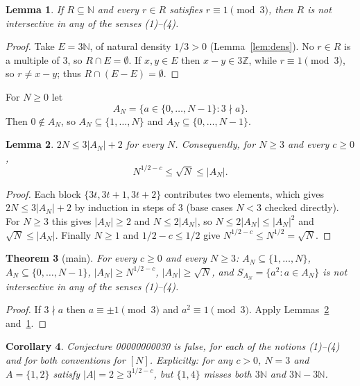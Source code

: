 \documentclass[11pt]{article}
\newtheorem{theorem}{Theorem}
\newtheorem{lemma}[theorem]{Lemma}
\newtheorem{corollary}[theorem]{Corollary}
\theoremstyle{definition}
\theoremstyle{remark}
\renewcommand{\_}{\oldus\allowbreak}
\newcommand{\N}{\mathbb{N}}
\newcommand{\Z}{\mathbb{Z}}
\begin{document}
\begin{lemma}\label{lem:mod3}
If $R\subseteq\N$ and every $r\in R$ satisfies $r\equiv1\pmod 3$, then $R$ is not intersective in any of the
senses (1)--(4).
\end{lemma}

\begin{proof}
Take $E=3\N$, of natural density $1/3>0$ (Lemma~\ref{lem:dens}). No $r\in R$ is a multiple of $3$, so
$R\cap E=\emptyset$. If $x,y\in E$ then $x-y\in 3\Z$, while $r\equiv1\pmod 3$, so $r\neq x-y$; thus
$R\cap(E-E)=\emptyset$.
\end{proof}

For $N\ge0$ let
\[
  A_N=\{a\in\{0,\dots,N-1\} : 3\nmid a\}.
\]
Then $0\notin A_N$, so $A_N\subseteq\{1,\dots,N\}$ and $A_N\subseteq\{0,\dots,N-1\}$.

\begin{lemma}\label{lem:size}
$2N\le 3|A_N|+2$ for every $N$. Consequently, for $N\ge3$ and every $c\ge0$,
\[
  N^{1/2-c}\le\sqrt N\le|A_N|.
\]
\end{lemma}

\begin{proof}
Each block $\{3t,3t+1,3t+2\}$ contributes two elements, which gives $2N\le3|A_N|+2$ by induction in steps of
$3$ (base cases $N<3$ checked directly). For $N\ge3$ this gives $|A_N|\ge2$ and $N\le2|A_N|$, so
$N\le 2|A_N|\le|A_N|^2$ and $\sqrt N\le|A_N|$. Finally $N\ge1$ and $1/2-c\le1/2$ give
$N^{1/2-c}\le N^{1/2}=\sqrt N$.
\end{proof}

\begin{theorem}[main]\label{thm:main}
For every $c\ge0$ and every $N\ge3$: $A_N\subseteq\{1,\dots,N\}$, $A_N\subseteq\{0,\dots,N-1\}$,
$|A_N|\ge N^{1/2-c}$, $|A_N|\ge\sqrt N$, and $S_{A_N}=\{a^2:a\in A_N\}$ is not intersective in any of the
senses (1)--(4).
\end{theorem}

\begin{proof}
If $3\nmid a$ then $a\equiv\pm1\pmod3$ and $a^2\equiv1\pmod3$. Apply Lemmas~\ref{lem:size}
and~\ref{lem:mod3}.
\end{proof}

\begin{corollary}
Conjecture 00000000030 is false, for each of the notions (1)--(4) and for both conventions for $[N]$.
Explicitly: for any $c>0$, $N=3$ and $A=\{1,2\}$ satisfy $|A|=2\ge3^{1/2-c}$, but $\{1,4\}$ misses both
$3\N$ and $3\N-3\N$.
\end{corollary}
\end{document}
